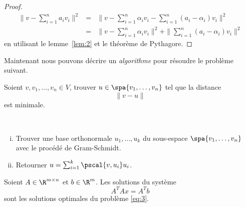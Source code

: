 \begin{proof}
  \begin{eqnarray*}
    \|v- \sum_{i=1}^n a_iv_i \|^2 & = &  \|v - \sum_{i=1}^n \alpha_iv_i  - \sum_{i=1}^n (a_i - \alpha_i)v_i \|^2 \\
                           & = & \|v - \sum_{i=1}^n \alpha_iv_i \|^2 + \| \sum_{i=1}^n (a_i - \alpha_i)v_i \|^2
  \end{eqnarray*}
en utilisant le lemme~\ref{lem:2} et le théorème de Pythagore. 
\end{proof}

\noindent 
Maintenant nous pouvons décrire un \emph{algorithme} pour résoudre le problème suivant. 
\begin{framed}
  \noindent 
  Soient $v,v_1,\dots,v_n \in V$, trouver $u \in \spa \{v_1,\dots,v_n\}$ tel que la distance 
  \begin{displaymath}
    \|v - u\|
  \end{displaymath}
  est minimale. 
\end{framed}

\begin{algorithm}
\label{alg:2}

~\\
\begin{enumerate}[i)]
\item Trouver une base orthonormale $u_1,\dots,u_k$ du sous-espace $\spa\{v_1,\dots,v_n\}$ 
  avec le procédé de Gram-Schmidt. 
\item Retourner $ u = \sum_{i=1}^k \pscal{v,u_i} u_i$. 
\end{enumerate}
\end{algorithm}






\begin{theorem}
  \label{thr:6}
  Soient $A \in \R^{m\times n}$ et $b \in \R^m$. Les solutions du système
  \begin{equation}
    \label{eq:4}    
    A^TAx = A^T b
  \end{equation}
  sont les solutions  optimales du problème \eqref{eq:3}. 
\end{theorem}

